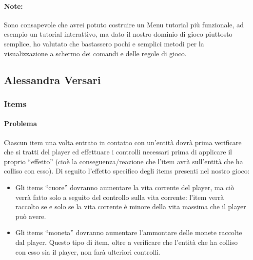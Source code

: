 \documentclass[a4paper,12pt]{report}
\begin{document}
\paragraph*{Note:}
Sono consapevole che avrei potuto costruire un Menu tutorial più funzionale, ad esempio un tutorial interattivo, ma dato il nostro dominio di 
gioco piuttosto semplice, ho valutato che bastassero pochi e semplici metodi per la visualizzazione a schermo dei comandi e delle regole di gioco.

\subsection{Alessandra Versari}
\subsubsection*{Items}
\paragraph*{Problema}
	Ciascun item una volta entrato in contatto con un'entità dovrà prima verificare che si tratti del player ed effettuare i controlli necessari prima di applicare il proprio “effetto” (cioè la conseguenza/reazione che l'item avrà sull'entità che ha colliso con esso).
	Di seguito l’effetto specifico degli items presenti nel nostro gioco:
	\begin{itemize}
		\item Gli items “cuore” dovranno aumentare la vita corrente del player, ma ciò verrà fatto solo a seguito del controllo sulla vita corrente: l'item verrà raccolto se e solo se la vita corrente è minore della vita massima che il player può avere. 
		\item Gli items “moneta” dovranno aumentare l'ammontare delle monete raccolte dal player. Questo tipo di item, oltre a verificare che l'entità che ha colliso con esso sia il player, non farà ulteriori controlli.
	\end{itemize}
\end{document}
